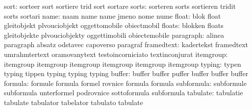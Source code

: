                      sort: sorteer                   sort
                           sortiere                  trid
                           sort                      sortare %
                    sorts: sorteren                  sorts
                           sortieren                 tridit
                           sorts                     sortari %
                     name: naam                      name
                           name                      jmeno
                           nome                      nume
                    float: blok                      float
                           gleitobjekt               plvouciobjekt
                           oggettomobile             obiectmobil
                   floats: blokken                   floats
                           gleitobjekte              plvouciobjekty
                           oggettimobili             obiectemobile
                paragraph: alinea                    paragraph
                           absatz                    odstavec
                           capoverso                 paragraf
               framedtext: kadertekst                framedtext
                           umrahmtertext             oramovanytext
                           testoincorniciato         textinconjurat
                itemgroup: itemgroup                 itemgroup
                           itemgroup                 itemgroup
                           itemgroup                 itemgroup
                   typing: typen                     typing
                           tippen                    typing
                           typing                    typing %
                   buffer: buffer                    buffer
                           puffer                    buffer
                           buffer                    buffer
                  formula: formule                   formula
                           formel                    rovnice
                           formula                   formula
               subformula: subformule                subformula
                           unterformel               podrovnice
                           sottoformula              subformula
                 tabulate: tabulatie                 tabulate
                           tabulator                 tabelator
                           tabulato                  tabulate

\stopsetupvariables


